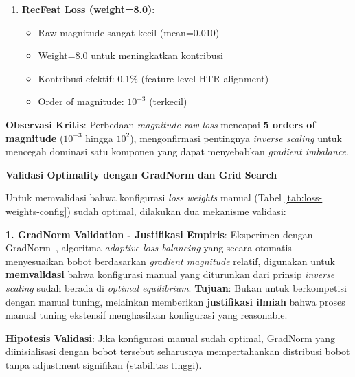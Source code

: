 \documentclass[12pt,a4paper]{article}
\begin{document}
\begin{enumerate}[leftmargin=*]
    \item \textbf{RecFeat Loss (weight=8.0)}:
    \begin{itemize}
        \item Raw magnitude sangat kecil (mean=0.010)
        \item Weight=8.0 untuk meningkatkan kontribusi
        \item Kontribusi efektif: 0.1\% (feature-level HTR alignment)
        \item Order of magnitude: $10^{-3}$ (terkecil)
    \end{itemize}
\end{enumerate}

\textbf{Observasi Kritis}: Perbedaan \textit{magnitude raw loss} mencapai \textbf{5 orders of magnitude} ($10^{-3}$ hingga $10^2$), mengonfirmasi pentingnya \textit{inverse scaling} untuk mencegah dominasi satu komponen yang dapat menyebabkan \textit{gradient imbalance}.

\textbf{Validasi Optimality dengan GradNorm dan Grid Search}

Untuk memvalidasi bahwa konfigurasi \textit{loss weights} manual (Tabel \ref{tab:loss-weights-config}) sudah optimal, dilakukan dua mekanisme validasi:

\textbf{1. GradNorm Validation - Justifikasi Empiris}: Eksperimen dengan GradNorm~\cite{chen2018gradnorm}, algoritma \textit{adaptive loss balancing} yang secara otomatis menyesuaikan bobot berdasarkan \textit{gradient magnitude} relatif, digunakan untuk \textbf{memvalidasi} bahwa konfigurasi manual yang diturunkan dari prinsip \textit{inverse scaling} sudah berada di \textit{optimal equilibrium}. \textbf{Tujuan}: Bukan untuk berkompetisi dengan manual tuning, melainkan memberikan \textbf{justifikasi ilmiah} bahwa proses manual tuning ekstensif menghasilkan konfigurasi yang reasonable.

\textbf{Hipotesis Validasi}: Jika konfigurasi manual sudah optimal, GradNorm yang diinisialisasi dengan bobot tersebut seharusnya mempertahankan distribusi bobot tanpa adjustment signifikan (stabilitas tinggi).
\end{document}
